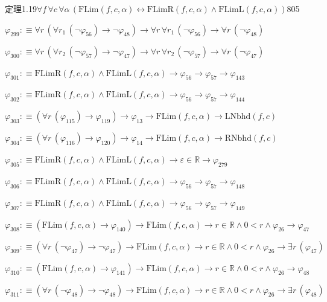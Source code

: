 \begin{fullproof}{定理1.19}{$\forall f\,\forall c\,\forall \alpha\,(\mathrm{FLim}(f,c,\alpha) \leftrightarrow \mathrm{FLimR}(f,c,\alpha) \land \mathrm{FLimL}(f,c,\alpha))$}{805}
\begin{abbrevlist}
\item $\varphi_{299} :\equiv \forall r\,(\forall r_{1}\,(\neg \varphi_{56}) \to \neg \varphi_{48}) \to \forall r\,\forall r_{1}\,(\neg \varphi_{56}) \to \forall r\,(\neg \varphi_{48})$
\item $\varphi_{300} :\equiv \forall r\,(\forall r_{2}\,(\neg \varphi_{57}) \to \neg \varphi_{47}) \to \forall r\,\forall r_{2}\,(\neg \varphi_{57}) \to \forall r\,(\neg \varphi_{47})$
\item $\varphi_{301} :\equiv \mathrm{FLimR}(f,c,\alpha) \land \mathrm{FLimL}(f,c,\alpha) \to \varphi_{56} \to \varphi_{57} \to \varphi_{143}$
\item $\varphi_{302} :\equiv \mathrm{FLimR}(f,c,\alpha) \land \mathrm{FLimL}(f,c,\alpha) \to \varphi_{56} \to \varphi_{57} \to \varphi_{144}$
\item $\varphi_{303} :\equiv (\forall r\,(\varphi_{115}) \to \varphi_{119}) \to \varphi_{13} \to \mathrm{FLim}(f,c,\alpha) \to \mathrm{LNbhd}(f,c)$
\item $\varphi_{304} :\equiv (\forall r\,(\varphi_{116}) \to \varphi_{120}) \to \varphi_{14} \to \mathrm{FLim}(f,c,\alpha) \to \mathrm{RNbhd}(f,c)$
\item $\varphi_{305} :\equiv \mathrm{FLimR}(f,c,\alpha) \land \mathrm{FLimL}(f,c,\alpha) \to \varepsilon \in \mathbb{R} \to \varphi_{279}$
\item $\varphi_{306} :\equiv \mathrm{FLimR}(f,c,\alpha) \land \mathrm{FLimL}(f,c,\alpha) \to \varphi_{56} \to \varphi_{57} \to \varphi_{148}$
\item $\varphi_{307} :\equiv \mathrm{FLimR}(f,c,\alpha) \land \mathrm{FLimL}(f,c,\alpha) \to \varphi_{56} \to \varphi_{57} \to \varphi_{149}$
\item $\varphi_{308} :\equiv (\mathrm{FLim}(f,c,\alpha) \to \varphi_{140}) \to \mathrm{FLim}(f,c,\alpha) \to r \in \mathbb{R} \land 0 < r \land \varphi_{26} \to \varphi_{47}$
\item $\varphi_{309} :\equiv (\forall r\,(\neg \varphi_{47}) \to \neg \varphi_{47}) \to \mathrm{FLim}(f,c,\alpha) \to r \in \mathbb{R} \land 0 < r \land \varphi_{26} \to \exists r\,(\varphi_{47})$
\item $\varphi_{310} :\equiv (\mathrm{FLim}(f,c,\alpha) \to \varphi_{141}) \to \mathrm{FLim}(f,c,\alpha) \to r \in \mathbb{R} \land 0 < r \land \varphi_{26} \to \varphi_{48}$
\item $\varphi_{311} :\equiv (\forall r\,(\neg \varphi_{48}) \to \neg \varphi_{48}) \to \mathrm{FLim}(f,c,\alpha) \to r \in \mathbb{R} \land 0 < r \land \varphi_{26} \to \exists r\,(\varphi_{48})$

\end{abbrevlist}
\end{fullproof}
